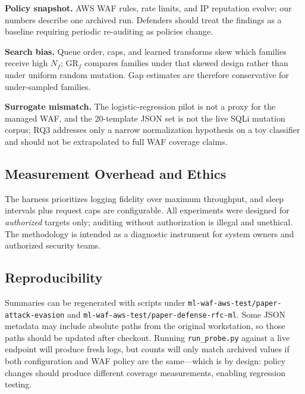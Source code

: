 \textbf{Policy snapshot.} AWS WAF rules, rate limits, and IP reputation evolve; our numbers describe one archived run. Defenders should treat the findings as a baseline requiring periodic re-auditing as policies change.

\textbf{Search bias.} Queue order, caps, and learned transforms skew which families receive high $N_f$; $\mathrm{GR}_f$ compares families under that skewed design rather than under uniform random mutation. Gap estimates are therefore conservative for under-sampled families.

\textbf{Surrogate mismatch.} The logistic-regression pilot is not a proxy for the managed WAF, and the 20-template JSON set is not the live SQLi mutation corpus; RQ3 addresses only a narrow normalization hypothesis on a toy classifier and should not be extrapolated to full WAF coverage claims.

\subsection{Measurement Overhead and Ethics}
The harness prioritizes logging fidelity over maximum throughput, and sleep intervals plus request caps are configurable. All experiments were designed for \emph{authorized} targets only; auditing without authorization is illegal and unethical. The methodology is intended as a diagnostic instrument for system owners and authorized security teams.

\subsection{Reproducibility}
Summaries can be regenerated with scripts under \texttt{ml-waf-aws-test/paper-attack-evasion} and \texttt{ml-waf-aws-test/paper-defense-rfc-ml}. Some JSON metadata may include absolute paths from the original workstation, so those paths should be updated after checkout. Running \texttt{run\_probe.py} against a live endpoint will produce fresh logs, but counts will only match archived values if both configuration and WAF policy are the same---which is by design: policy changes should produce different coverage measurements, enabling regression testing.

